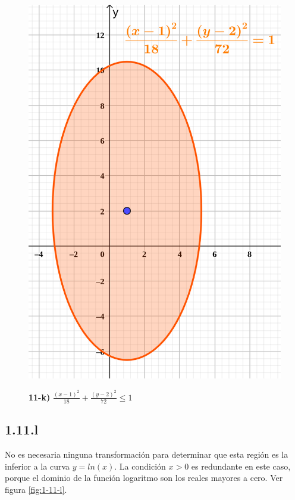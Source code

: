 \documentclass{article}
\begin{document}
\begin{figure}[ht]
\caption{\textbf{11-k)} $\frac{(x-1)^2}{18} + \frac{(y-2)^2}{72} \leq 1$}
\includegraphics[scale=0.3]{../img/exercises/guide_01/11_k.png} 
\centering
\label{fig:1-11-k}
\end{figure}

\subsection*{1.11.l}
\label{subsec:1.11.l}

No es necesaria ninguna transformación para determinar que esta región es la inferior a la curva $y = ln(x)$. La condición $x > 0$ es redundante en este caso, porque el dominio de la función logaritmo son los reales mayores a cero. Ver figura \ref{fig:1-11-l}.
\end{document}
